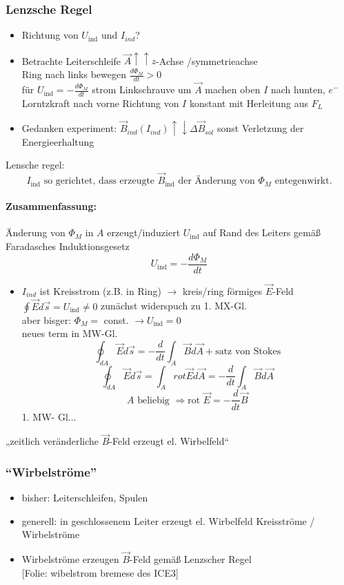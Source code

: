 \documentclass[titlepage,12pt,a4paper,ngerman]{report}
\newcommand{\tx}[1]{\textrm{#1}}
\newcommand{\uind}{U_{\tx{ind}}}
\newcommand{\folie}[1]{\color{gray}[Folie: #1]\color{black}}
\begin{document}
\subsubsection{Lenzsche Regel}
\begin{itemize}
	\item Richtung von $\uind$ und $I_{ind}$?
	\item Betrachte Leiterschleife $\vec{A} \uparrow \uparrow z$-Achse /symmetrieachse\\
	Ring nach links bewegen $\frac{d\Phi_M}{dt}>0$\\
	für $\uind = - \frac{d\Phi_M}{dt}$ strom Linkschrauve um $\vec{A}$ machen oben $I$ nach hunten, $e^-$ Lorntzkraft nach vorne Richtung von $I$ konstant mit Herleitung aus $F_L$
	\item Gedanken experiment: $\vec{B}_{ind}(I_{ind}) \uparrow \downarrow \Delta \vec{B}_{sol}$ sonst Verletzung der Energieerhaltung
\end{itemize}
Lensche regel:
$$\boxed{I_{\tx{ind}} \tx{ so gerichtet, dass erzeugte }\vec{B}_{\tx{ind}}\tx{ der Änderung von }\Phi_M \tx{ entegenwirkt.}}$$

\paragraph{Zusammenfassung:}
Änderung von $\Phi_M$ in $A$ erzeugt/induziert $\uind$ auf Rand des Leiters gemäß
Faradasches Induktionsgesetz
$$\boxed{\uind= -\frac{d \Phi_M}{dt}}$$
\begin{itemize}
	\item $I_{ind}$ ist Kreisstrom (z.B. in Ring)
	$\rightarrow$ kreis/ring förmiges $\vec{E}$-Feld\\
	$\oint \vec{E}d \vec{s} = \uind \neq 0$ zunächst widerspuch zu 1. MX-Gl.\\
	aber bisger: $\Phi_M = $ const. $\rightarrow \uind =0$\\
	neues term in MW-Gl.
	$$\boxed{\oint_{dA} \vec{E}d \vec{s} = - \frac{d}{dt}\int_A \vec{B} d \vec{A} + \tx{satz von Stokes}}$$
	$$\oint_{dA} \vec{E}d \vec{s} = \int_A rot \vec{E}d \vec{A} = - \frac{d}{dt}\int_A \vec{B}d \vec{A}$$
	$$A \tx{ beliebig } \Rightarrow \boxed{\tx{rot } \vec{E}= -\frac{d}{dt}\vec{B}}$$
	1. MW- Gl...
\end{itemize}
„zeitlich veränderliche $\vec{B}$-Feld erzeugt el. Wirbelfeld“
\subsubsection{``Wirbelströme''}
\begin{itemize}
	\item bisher: Leiterschleifen, Spulen
	\item generell: in geschlossenem Leiter erzeugt el. Wirbelfeld Kreisströme / Wirbelströme
	\item Wirbelströme erzeugen $\vec{B}$-Feld gemäß Lenzscher Regel\\
	\folie{wibelstrom bremese des ICE3}
\end{itemize}
\end{document}
